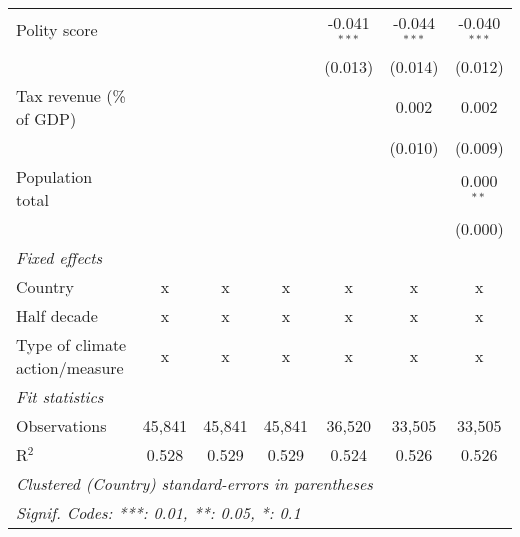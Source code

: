 \begin{tabular}{lcccccc}
   Polity score                                                  &         &               &               & -0.041$^{***}$ & -0.044$^{***}$ & -0.040$^{***}$\\   
                                                                 &         &               &               & (0.013)        & (0.014)        & (0.012)\\   
   Tax revenue (\% of GDP)                                       &         &               &               &                & 0.002          & 0.002\\   
                                                                 &         &               &               &                & (0.010)        & (0.009)\\   
   Population total                                              &         &               &               &                &                & 0.000$^{**}$\\   
                                                                 &         &               &               &                &                & (0.000)\\   
   \emph{Fixed effects}\\
   Country                                                       & x       & x             & x             & x              & x              & x\\  
   Half decade                                                   & x       & x             & x             & x              & x              & x\\  
   Type of climate action/measure                                & x       & x             & x             & x              & x              & x\\  
   \midrule \emph{Fit statistics}\\
   Observations                                                  & 45,841  & 45,841        & 45,841        & 36,520         & 33,505         & 33,505\\  
   R$^2$                                                         & 0.528   & 0.529         & 0.529         & 0.524          & 0.526          & 0.526\\  
   \midrule
   \multicolumn{7}{l}{\emph{Clustered (Country) standard-errors in parentheses}}\\
   \multicolumn{7}{l}{\emph{Signif. Codes: ***: 0.01, **: 0.05, *: 0.1}}\\
\end{tabular}
\par\endgroup



